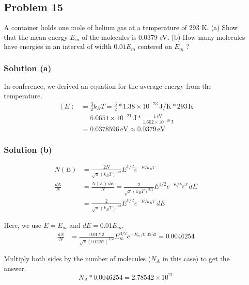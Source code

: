 \documentclass[12pt]{article}
\newcommand{\e}[1]{e^{#1}}
\newcommand{\E}[1]{\times 10^{#1}}
\begin{document}
    \pagebreak
    \subsection{Problem 15}
        A container holds one mole of helium gas at a temperature of 293 K.
        (a) Show that the mean energy $E_m$ of the molecules is 0.0379 eV.
        (b) How many molecules have energies in an interval of width $0.01E_m$ centered on $E_m$ ?

        \subsubsection{Solution (a)}
            In conference, we derived an equation for the average energy from the temperature.
            \begin{align}
                \left\langle E \right\rangle
                    &=  \frac{3}{2} k_B T
                    =   \frac{3}{2} * 1.38\E{-23}\,\unit{\joule/\kelvin} * 293\,\unit{\kelvin}\\
                    &=  6.0651\E{-21}\,\unit{\joule} * \frac{1\,\unit{\eV}}{1.602\E{-19}\,\unit{\joule}}\\
                    &=  0.0378596\,\unit{\eV}
                    \approx \boxed{0.0379\,\unit{\eV}}
            \end{align}

        \subsubsection{Solution (b)}
            \begin{align}
                N(E)    &=  \frac{2N}{\sqrt{\pi} (k_B T)^{3/2}} E^{1/2} \e{-E/k_B T}\\
                \frac{dN}{N}    &=  \frac{N(E)\,dE}{N}    =   \frac{2}{\sqrt{\pi} (k_B T)^{3/2}} E^{1/2} \e{-E/k_B T}\,dE\\
                    &=  \frac{2}{\sqrt{\pi} (k_B T)^{3/2}} E^{1/2} \e{-E/k_B T}\,dE
            \end{align}

            Here, we use $E = E_m$ and $dE = 0.01 E_m$.
            \begin{align}
                \frac{dN}{N}    &=  \frac{0.01 * 2}{\sqrt{\pi} (0.0252)^{3/2}} E_m^{3/2} e^{-E_m/0.0252}
                    =   0.0046254
            \end{align}

            Multiply both sides by the number of molecules ($N_A$ in this case) to get the answer.
            \begin{equation}
                N_A * 0.0046254 =   \boxed{2.78542\E{21}}
            \end{equation}
        
\end{document}
